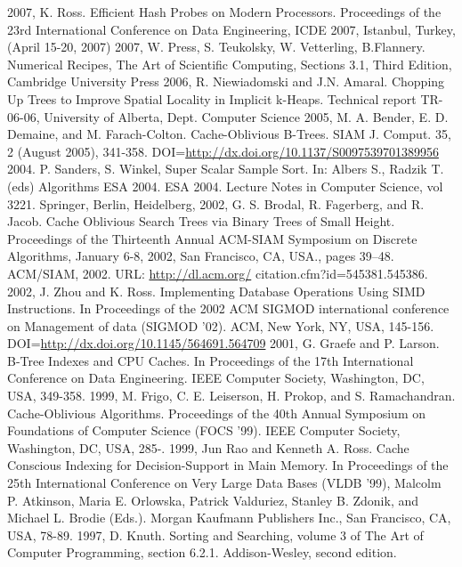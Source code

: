 \documentclass[preprint,1p,times]{elsarticle}
\begin{document}
\begin{thebibliography}{9}
 2007, K. Ross. Efficient Hash Probes on Modern Processors. Proceedings of the 23rd International Conference on Data Engineering, ICDE 2007, Istanbul, Turkey, (April 15-20, 2007)
 2007, W. Press, S. Teukolsky, W. Vetterling, B.Flannery. Numerical Recipes, The Art of Scientific Computing, Sections 3.1, Third Edition, Cambridge University Press
 2006, R. Niewiadomski and J.N. Amaral. Chopping Up Trees to Improve Spatial Locality in Implicit k-Heaps. Technical report TR-06-06, University of Alberta, Dept. Computer Science
 2005, M. A. Bender, E. D. Demaine, and M. Farach-Colton. Cache-Oblivious B-Trees. SIAM J. Comput. 35, 2 (August 2005), 341-358. DOI=\url{http://dx.doi.org/10.1137/S0097539701389956}
 2004. P. Sanders, S. Winkel, Super Scalar Sample Sort. In: Albers S., Radzik T. (eds) Algorithms ESA 2004. ESA 2004. Lecture Notes in Computer Science, vol 3221. Springer, Berlin, Heidelberg, 
 2002, G. S. Brodal, R. Fagerberg, and R. Jacob. Cache Oblivious Search Trees via Binary Trees of Small Height. Proceedings of the Thirteenth Annual ACM-SIAM Symposium on Discrete Algorithms, January 6-8, 2002, San Francisco, CA, USA., pages 39–48. ACM/SIAM, 2002. URL: \url{http://dl.acm.org/}
citation.cfm?id=545381.545386.
 2002, J. Zhou and K. Ross. Implementing Database Operations Using SIMD Instructions. In Proceedings of the 2002 ACM SIGMOD international conference on Management of data (SIGMOD '02). ACM, New York, NY, USA, 145-156. DOI=\url{http://dx.doi.org/10.1145/564691.564709}
 2001, G. Graefe and P. Larson. B-Tree Indexes and CPU Caches. In Proceedings of the 17th International Conference on Data Engineering. IEEE Computer Society, Washington, DC, USA, 349-358.
 1999, M. Frigo, C. E. Leiserson, H. Prokop, and S. Ramachandran. Cache-Oblivious Algorithms. Proceedings of the 40th Annual Symposium on Foundations of Computer Science (FOCS '99). IEEE Computer Society, Washington, DC, USA, 285-. 
 1999, Jun Rao and Kenneth A. Ross. Cache Conscious Indexing for Decision-Support in Main Memory. In Proceedings of the 25th International Conference on Very Large Data Bases (VLDB '99), Malcolm P. Atkinson, Maria E. Orlowska, Patrick Valduriez, Stanley B. Zdonik, and Michael L. Brodie (Eds.). Morgan Kaufmann Publishers Inc., San Francisco, CA, USA, 78-89.
 1997, D. Knuth. Sorting and Searching, volume 3 of The Art of Computer Programming, section 6.2.1. Addison-Wesley, second edition.

\end{thebibliography}
\end{document}
